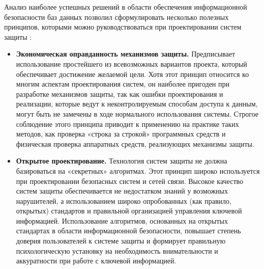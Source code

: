 Анализ наиболее успешных решений в области обеспечения информационной безопасности баз данных
позволил сформулировать несколько полезных принципов, которыми можно руководствоваться
при проектировании систем защиты \autocite{security-policy_14}:
\begin{itemize}
	\item \textbf{Экономическая оправданность механизмов защиты.}
        Предписывает использование простейшего из всевозможных вариантов проекта, который
        обеспечивает достижение желаемой цели. Хотя этот принцип относится ко многим аспектам
        проектирования систем, он наиболее пригоден при разработке механизмов защиты, так как
        ошибки проектирования и реализации, которые ведут к неконтролируемым способам доступа
        к данным, могут быть не замечены в ходе нормального использования системы. Строгое
        соблюдение этого принципа приводит к применению на практике таких методов, как проверка
        «строка за строкой» программных средств и физическая проверка аппаратных средств,
        реализующих механизмы защиты.

    \item \textbf{Открытое проектирование.}
        Технология систем защиты не должна базироваться на «секретных» алгоритмах. Этот принцип
        широко используется при проектировании безопасных систем и сетей связи. Высокое качество
        систем защиты обеспечивается не недостатком знаний у возможных нарушителей,
        а использованием широко опробованных (как правило, открытых) стандартов и правильной
        организацией управления ключевой информацией. Использование алгоритмов, основанных на
        открытых стандартах в области информационной безопасности, повышает степень доверия
        пользователей к системе защиты и формирует правильную психологическую установку на
        необходимость внимательности и аккуратности при работе с ключевой информацией.


\end{itemize}
